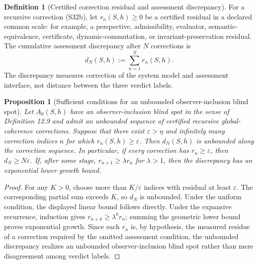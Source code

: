 \documentclass[11pt]{article}
\newtheorem{proposition}{Proposition}
\theoremstyle{definition}
\newtheorem{definition}{Definition}
\begin{document}
\begin{definition}[Certified correction residual and assessment discrepancy]
For a recursive correction (S32b), let $r_n(S, h) \geq 0$ be a certified residual in a declared common scale: for example, a perspective, admissibility, evaluator, semantic-equivalence, certificate, dynamic-commutation, or invariant-preservation residual. The cumulative assessment discrepancy after $N$ corrections is
\begin{equation}
d_N(S, h) := \sum_{n=1}^{N} r_n(S, h). \tag{S32d}
\end{equation}
The discrepancy measures correction of the system model and assessment interface, not distance between the three verdict labels.
\end{definition}

\begin{proposition}[Sufficient conditions for an unbounded observer-inclusion blind spot]
Let $A_0(S, h)$ have an observer-inclusion blind spot in the sense of Definition 12.9 and admit an unbounded sequence of certified recursive global-coherence corrections. Suppose that there exist $\varepsilon > \eta$ and infinitely many correction indices $n$ for which $r_n(S, h) \geq \varepsilon$. Then $d_N(S, h)$ is unbounded along the correction sequence. In particular, if every correction has $r_n \geq \varepsilon$, then $d_N \geq N\varepsilon$. If, after some stage, $r_{n+1} \geq \lambda r_n$ for $\lambda > 1$, then the discrepancy has an exponential lower growth bound.
\end{proposition}

\begin{proof}
For any $K > 0$, choose more than $K/\varepsilon$ indices with residual at least $\varepsilon$. The corresponding partial sum exceeds $K$, so $d_N$ is unbounded. Under the uniform condition, the displayed linear bound follows directly. Under the expansive recurrence, induction gives $r_{n+k} \geq \lambda^k r_n$; summing the geometric lower bound proves exponential growth. Since each $r_n$ is, by hypothesis, the measured residue of a correction required by the omitted assessment condition, the unbounded discrepancy realizes an unbounded observer-inclusion blind spot rather than mere disagreement among verdict labels.
\end{proof}
\end{document}
